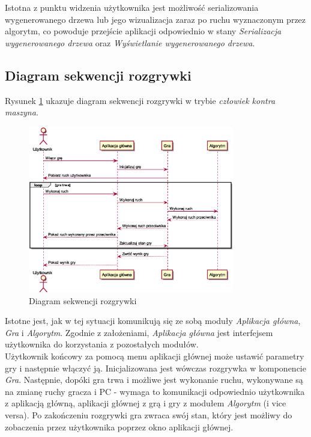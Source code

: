\documentclass{article}
\newcommand{\modulename}[1]{\textit{#1}}
\begin{document}
	\noindent Istotna z punktu widzenia użytkownika jest możliwość serializowania wygenerowanego drzewa lub jego wizualizacja zaraz po ruchu wyznaczonym przez algorytm, co powoduje przejście aplikacji odpowiednio w stany \modulename{Serializacja wygenerowanego drzewa} oraz \modulename{Wyświetlanie wygenerowanego drzewa}.
	\clearpage
	
	\subsection{Diagram sekwencji rozgrywki}
	Rysunek \ref{rys:sequencegame} ukazuje diagram sekwencji rozgrywki w trybie \modulename{człowiek kontra maszyna}.
	\begin{figure}[h]
		\centering
		\includegraphics[width=0.8\textwidth]{play_with_pc_sequence}
		\caption{Diagram sekwencji rozgrywki}
		\label{rys:sequencegame}
	\end{figure}

	\noindent Istotne jest, jak w tej sytuacji komunikują się ze sobą moduły \modulename{Aplikacja główna}, \modulename{Gra} i \modulename{Algorytm}. Zgodnie z założeniami, \modulename{Aplikacja główna} jest interfejsem użytkownika do korzystania z pozostałych modułów.\\
	
	\noindent Użytkownik końcowy za pomocą menu aplikacji głównej może ustawić parametry gry i następnie włączyć ją. Inicjalizowana jest wówczas rozgrywka w komponencie \textit{Gra}. Następnie, dopóki gra trwa i możliwe jest wykonanie ruchu, wykonywane są na zmianę ruchy gracza i PC - wymaga to komunikacji odpowiednio użytkownika z aplikacją główną, aplikacji głównej z grą i gry z modułem \modulename{Algorytm} (i vice versa). Po zakończeniu rozgrywki gra zwraca swój stan, który jest możliwy do zobaczenia przez użytkownika poprzez okno aplikacji głównej.\\
	
\end{document}
